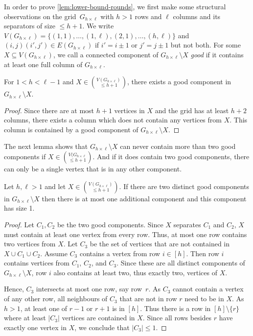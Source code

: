 \documentclass[a4paper,UKenglish,cleveref, autoref, thm-restate]{lipics-v2021}
\newcommand{\grid}[2]{\ensuremath{G_{#1 \times #2}}}
\begin{document}
In order to prove \cref{lem:lower-bound-rounds}, we first make some structural observations on the grid~\grid{h}{\ell} with $h>1$ rows and $\ell$ columns and its separators of size $\leq h+1$.
We write $V(\grid{h}{\ell})=\{(1,1),\ldots,(1,\ell),(2,1),\ldots,(h,\ell)\}$ and $(i,j)(i',j')\in E(\grid{h}{\ell})$ if $i'=i\pm 1$ or $j'=j\pm 1$ but not both.
For some $X\subseteq V(\grid{h}{\ell})$, we call a connected component of $\grid{h}{\ell}\setminus X$ \emph{good} if it contains at least one full column of \grid{h}{\ell}.

\begin{observation} \label{obs:good-component}
	For $1 < h < \ell - 1$ and $X\in \binom{V(\grid{h}{\ell})}{\leq h+1}$, there exists a good component in $\grid{h}{\ell} \setminus X$.
\end{observation}
\begin{proof}
	Since there are at most $h+1$ vertices in $X$ and the grid has at least $h+2$ columns, there exists a column which does not contain any vertices from $X$. This column is contained by a good component of $\grid{h}{\ell} \setminus X$.
\end{proof}
The next lemma shows that $\grid{h}{\ell}\setminus X$ can never contain more than two good components if $X\in\binom{V(\grid{h}{\ell}}{\leq h+1}$.
And if it does contain two good components, there can only be a single vertex that is in any other component.

\begin{lemma}
	\label{lem:third-comp-single}
	Let $h,\ell>1$ and let $X\in \binom{V(\grid{h}{\ell})}{\leq h+1}$. If there are two distinct good components in $\grid{h}{\ell}\setminus X$ then there is at most one additional component and this component has size 1.
\end{lemma}

\begin{proof}
	Let $C_1,C_2$ be the two good components.
	Since $X$ separates $C_1$ and $C_2$, $X$ must contain at least one vertex from every row. Thus, at most one row contains two vertices from $X$.
	Let $C_3$ be the set of vertices that are not contained in $X\cup C_1\cup C_2$.
	Assume $C_3$ contains a vertex from row $i\in[h]$.
	Then row $i$ contains vertices from $C_1$, $C_2$, and $C_3$. 
	Since these are all distinct components of $\grid{h}{\ell}\setminus X$, row $i$ also contains at least two, thus exactly two, vertices of $X$.
	
	Hence, $C_3$ intersects at most one row, say row~$r$.
	As $C_3$ cannot contain a vertex of any other row, all neighbours of $C_3$ that are not in row $r$ need to be in $X$.
	As $h>1$, at least one of $r-1$ or $r+1$ is in $[h]$.
	Thus there is a row in $[h]\setminus \{r\}$ where at least $|C_3|$ vertices are contained in $X$.
	Since all rows besides $r$ have exactly one vertex in $X$, we conclude that $|C_3|\leq 1$.
\end{proof}
\end{document}
